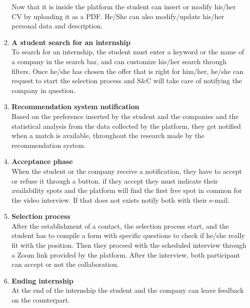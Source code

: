 \begin{enumerate}
    Now that it is inside the platform the student can insert or modify his/her CV by uploading it as a PDF. He/She can also modify/update his/her personal data and description.
    \item \textbf{A student search for an internship}\\
    To search for an internship, the student must enter a keyword or the name of a company in the search bar, and can customize his/her search through filters. Once he/she has chosen the offer that is right for him/her, he/she can request to start the selection process and S\&C will take care of notifying the company in question.
    \item \textbf{Recommendation system notification}\\
    Based on the preference inserted by the student and the companies and the statistical analysis from the data collected by the platform, they get notified when a match is available, throughout the research made by the recommendation system.
    \item \textbf{Acceptance phase}\\
    When the student or the company receive a notification, they have to accept or refuse it through a button. if they accept they must indicate their availability spots and the platform will find the first free spot in common for the video interview. If that does not exists notify both with their e-mail.
    \item \textbf{Selection process}\\
    After the establishment of a contact, the selection process start, and the student has to compile a form with specific questions to check if he/she really fit with the position. Then they proceed with the scheduled interview through a Zoom link provided by the platform. After the interview, both participant can accept or not the collaboration.
    \item \textbf{Ending internship}\\
    At the end of the internship the student and the company can leave feedback on the counterpart.    
\end{enumerate}

